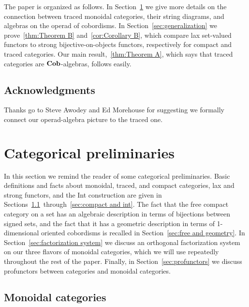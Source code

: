 \documentclass[12pt,oneside,article,draft]{memoir}
\begin{document}
The paper is organized as follows.  In Section~\ref{sec:traced categories} we give more details on
the connection between traced monoidal categories, their string diagrams, and algebras on the operad
of cobordisms.  In Section~\ref{sec:generalization} we prove~\ref{thm:Theorem B}
and~\ref{cor:Corollary B}, which compare lax set-valued functors to strong bijective-on-objects
functors, respectively for compact and traced categories.  Our main result,~\ref{thm:Theorem A},
which says that traced categories are $\mathbf{Cob}$-algebras, follows easily.

\section*{Acknowledgments}

Thanks go to Steve Awodey and Ed Morehouse for suggesting we formally connect our operad-algebra
picture to the traced one.

\chapter{Categorical preliminaries}\label{sec:traced categories}

In this section we remind the reader of some categorical preliminaries.  Basic definitions and facts
about monoidal, traced, and compact categories, lax and strong functors, and the Int construction
are given in Sections~\ref{sec:prelim monoidal}~through~\ref{sec:compact and int}.  The fact that
the free compact category on a set has an algebraic description in terms of bijections between
signed sets, and the fact that it has a geometric description in terms of 1-dimensional oriented
cobordisms is recalled in Section~\ref{sec:free and geometry}.  In Section~\ref{sec:factorization
system} we discuss an orthogonal factorization system on our three flavors of monoidal categories,
which we will use repeatedly throughout the rest of the paper.  Finally, in
Section~\ref{sec:profunctors} we discuss profunctors between categories and monoidal categories.


\section{Monoidal categories}\label{sec:prelim monoidal}
\end{document}

